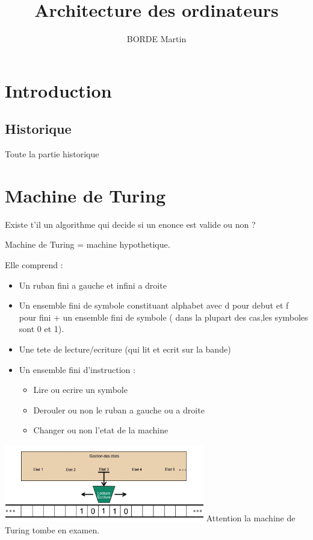 \documentclass{article}
\title{Architecture des ordinateurs}
\author{BORDE Martin}
\begin{document}
\maketitle

\section{Introduction}
\subsection{Historique}
\blindtext
Toute la partie historique

\section{Machine de Turing}
Existe t'il un algorithme qui decide si un enonce est valide ou non ?

Machine de Turing = machine hypothetique.

Elle comprend :
\begin{itemize}[label=\textbullet]
	\item Un ruban fini a gauche  et infini a droite 
	\item Un ensemble fini de symbole constituant alphabet avec d pour debut et f pour fini + un ensemble fini de symbole ( dans la plupart des cas,les symboles sont 0 et 1).
	\item Une tete de lecture/ecriture (qui lit et ecrit sur la bande)
	\item Un ensemble fini d'instruction :
	\begin{itemize}
		\item Lire ou ecrire un symbole
		\item Derouler ou non le ruban a gauche ou a droite
		\item Changer ou non l'etat de la machine
	\end{itemize}
\end{itemize}
\includegraphics{img/machine.jpg}
\newline
Attention la machine de Turing tombe en examen.
\newline
\end{document}
